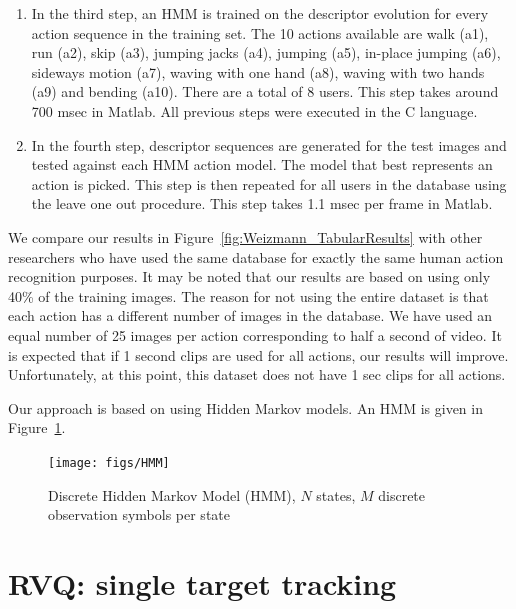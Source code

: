 \documentclass[12pt,letterpaper,doublespaced,ETD]{gt-ece-thesis} %
\begin{document}
\begin{Body}
\begin{enumerate}
\item In the third step, an HMM is trained on the descriptor evolution for every action sequence in the training set.  The 10 actions available are walk (a1), run (a2), skip (a3), jumping jacks (a4), jumping (a5), in-place jumping (a6), sideways motion (a7), waving with one hand (a8), waving with two hands (a9) and bending (a10).  There are a total of 8 users.  This step takes around 700 msec in Matlab.  All previous steps were executed in the C language.

\item In the fourth step, descriptor sequences are generated for the test images and tested against each HMM action model.  The model that best represents an action is picked.  This step is then repeated for all users in the database using the leave one out procedure.  This step takes 1.1 msec per frame in Matlab.   
\end{enumerate}

We compare our results in Figure~\ref{fig:Weizmann_TabularResults} with other researchers who have used the same database for exactly the same human action recognition purposes.  It may be noted that our results are based on using only 40\% of the training images.  The reason for not using the entire dataset is that each action has a different number of images in the database.  We have used an equal number of 25 images per action corresponding to half a second of video.  It is expected that if 1 second clips are used for all actions, our results will improve.  Unfortunately, at this point, this dataset does not have 1 sec clips for all actions.  



Our approach is based on using Hidden Markov models.  An HMM is given in Figure~\ref{fig:HMM}.  

	\begin{figure}			
		\texttt{[image: figs/HMM]}
		\caption{Discrete Hidden Markov Model (HMM), $N$ states, $M$ discrete observation symbols per state}
		\label{fig:HMM}
	\end{figure}






\chapter{RVQ: single target tracking}
\label{chap_RVQ_STT}	


\end{Body}
\end{document}
